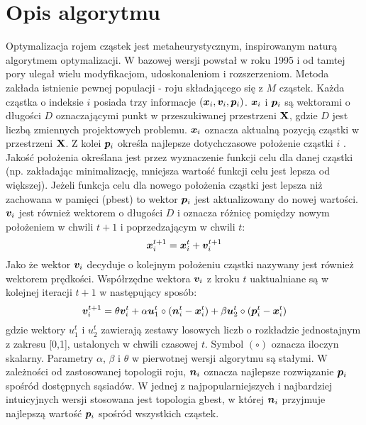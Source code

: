 \section{Opis algorytmu}
Optymalizacja rojem cząstek  jest metaheurystycznym, inspirowanym naturą algorytmem optymalizacji. W bazowej wersji powstał w roku 1995 \parencite{Kennedy1995a,Eberhart1995} i od tamtej pory ulegał wielu modyfikacjom, udoskonaleniom i rozszerzeniom. Metoda zakłada istnienie pewnej populacji - roju składającego się z $M$ cząstek. Każda cząstka o indeksie $i$ posiada trzy informacje $(\bm{x}_i,\bm{v}_i,\bm{p}_i)$. $\bm{x}_i$ i $\bm{p}_i$ są wektorami o długości $D$ oznaczającymi punkt w przeszukiwanej przestrzeni $\mathbf{X}$, gdzie $D$ jest liczbą zmiennych projektowych problemu. $\bm{x}_i$ oznacza aktualną pozycją cząstki w przestrzeni $\mathbf{X}$. Z kolei $\bm{p}_i$ określa najlepsze dotychczasowe położenie cząstki $i$ . Jakość położenia określana jest przez wyznaczenie funkcji celu dla danej cząstki (np. zakładając minimalizację, mniejsza wartość funkcji celu jest lepsza od większej). Jeżeli funkcja celu dla nowego położenia cząstki jest lepsza niż zachowana w pamięci (pbest) to wektor $\bm{p}_i$ jest aktualizowany do nowej wartości. $\bm{v}_i$ jest również wektorem o długości $D$ i oznacza różnicę pomiędzy nowym położeniem w chwili $t+1$ i poprzedzającym w chwili $t$:
\begin{equation}
	\bm{x}_i^{t+1}=\bm{x}_i^t+\bm{v}_i^{t+1}
\end{equation}
 Jako że wektor $\bm{v}_i$ decyduje o kolejnym położeniu cząstki nazywany jest również wektorem prędkości. Współrzędne wektora $\bm{v}_i$ z kroku $t$ uaktualniane są w kolejnej iteracji $t+1$ w następujący sposób:
\begin{equation} \label{eq: pso_velocity}
	\bm{v}_{i}^{t+1}=\theta\bm{v}_i^t+\alpha\bm{u}_1^t\circ (\bm{n}_i^t-\bm{x}_i^t)+\beta\bm{u}_2^t\circ(\bm{p}_i^t-\bm{x}_i^t)
\end{equation}
gdzie wektory $u_1^t$ i $u_2^t$ zawierają zestawy losowych liczb o rozkładzie jednostajnym z zakresu [0,1], ustalonych w chwili czasowej $t$. Symbol $(\circ)$ oznacza iloczyn skalarny. Parametry $\alpha$, $\beta$ i $\theta$ w pierwotnej wersji algorytmu są stałymi. W zależności od zastosowanej topologii roju, $\bm{n}_i$ oznacza najlepsze rozwiązanie $\bm{p}_i$ spośród dostępnych sąsiadów. W jednej z najpopularniejszych i najbardziej intuicyjnych wersji stosowana jest topologia gbest, w której $\bm{n}_i$ przyjmuje najlepszą wartość $\bm{p}_i$ spośród wszystkich cząstek.
